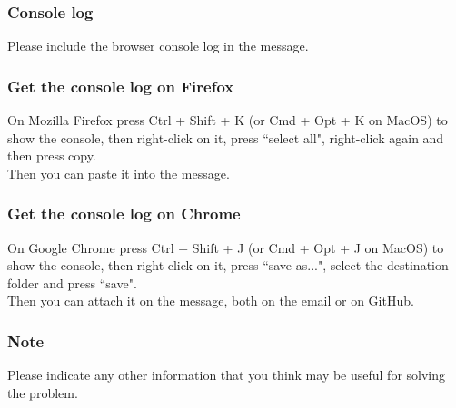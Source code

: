 \documentclass[ManualeUtente]{subfiles}
\begin{document}
\subsubsection{Console log}
Please include the browser console log in the message.
\subsubsection{Get the console log on Firefox}
On Mozilla Firefox press Ctrl + Shift + K (or Cmd + Opt + K on MacOS) to show the console, then right-click on it, press ``select all", right-click again and then press copy. \\
Then you can paste it into the message.
\subsubsection{Get the console log on Chrome}
On Google Chrome press Ctrl + Shift + J (or Cmd + Opt + J on MacOS) to show the console, then right-click on it, press ``save as...", select the destination folder and press ``save". \\
Then you can attach it on the message, both on the email or on GitHub.

\subsubsection{Note}
Please indicate any other information that you think may be useful for solving the problem.
\end{document}
